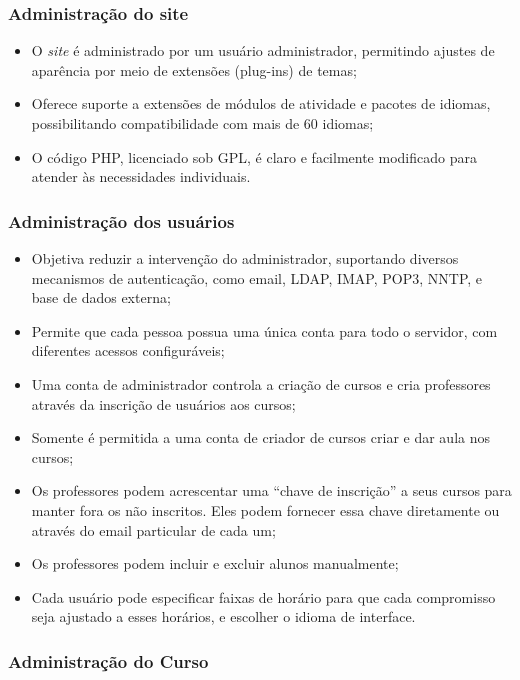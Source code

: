 \subsubsection{Administração do site}

\begin{itemize}
    \item O \textit{site} é administrado por um usuário administrador, permitindo ajustes de aparência por meio de extensões (plug-ins) de temas;
    \item Oferece suporte a extensões de módulos de atividade e pacotes de idiomas, possibilitando compatibilidade com mais de 60 idiomas; 
    \item O código PHP, licenciado sob GPL, é claro e facilmente modificado para atender às necessidades individuais.
\end{itemize}

\subsubsection{Administração dos usuários}

\begin{itemize}
    \item Objetiva reduzir a intervenção do administrador, suportando diversos mecanismos de autenticação, como email, LDAP, IMAP, POP3, NNTP, e base de dados externa;
    \item Permite que cada pessoa possua uma única conta para todo o servidor, com diferentes acessos configuráveis; 
    \item Uma conta de administrador controla a criação de cursos e cria professores através da inscrição de usuários aos cursos;
    \item Somente é permitida a uma conta de criador de cursos criar e dar aula nos cursos;
    \item Os professores podem acrescentar uma “chave de inscrição” a seus cursos para manter fora os não inscritos. Eles podem fornecer essa chave diretamente ou através do email particular de cada um;
    \item Os professores podem incluir e excluir alunos manualmente;
    \item Cada usuário pode especificar faixas de horário para que cada compromisso seja ajustado a esses horários, e escolher o idioma de interface.
\end{itemize}

\subsubsection{Administração do Curso}

